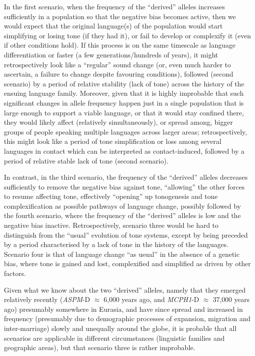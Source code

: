 \documentclass[twoside,onecolumn]{article}
\begin{document}
In the first scenario, when the frequency of the ``derived'' alleles increases sufficiently in a population so that the negative bias becomes active, then we would expect that the original language(s) of the population would start simplifying or losing tone (if they had it), or fail to develop or complexify it (even if other conditions hold).
If this process is on the same timescale as language differentiation or faster (a few generations/hundreds of years), it might retrospectively look like a ``regular'' sound change (or, even much harder to ascertain, a failure to change despite favouring conditions), followed (second scenario) by a period of relative stability (lack of tone) across the history of the ensuing language family.
Moreover, given that it is highly improbable that such significant changes in allele frequency happen just in a single population that is large enough to support a viable language, or that it would stay confined there, they would likely affect (relatively simultaneously), or spread among, bigger groups of people speaking multiple languages across larger areas; retrospectively, this might look like a period of tone simplification or loss among several languages in contact which can be interpreted as contact-induced, followed by a period of relative stable lack of tone (second scenario).

In contrast, in the third scenario, the frequency of the ``derived'' alleles decreases sufficiently to remove the negative bias against tone, ``allowing'' the other forces to resume affecting tone, effectively ``opening'' up tonogenesis and tone complexification as possible pathways of language change, possibly followed by the fourth scenario, where the frequency of the ``derived'' alleles is low and the negative bias inactive.
Retrospectively, scenario three would be hard to distinguish from the ``usual'' evolution of tone systems, except by being preceded by a period characterised by a lack of tone in the history of the languages.
Scenario four is that of language change ``as usual'' in the absence of a genetic bias, where tone is gained and lost, complexified and simplified as driven by other factors.

Given what we know about the two ``derived'' alleles, namely that they emerged relatively recently (\textit{ASPM}-D $\approx$ 6,000 years ago, and \textit{MCPH1}-D $\approx$ 37,000 years ago) presumably somewhere in Eurasia, and have since spread and increased in frequency (presumably due to demographic processes of expansion, migration and inter-marriage) slowly and unequally around the globe, it is probable that all scenarios are applicable in different circumstances (linguistic families and geographic areas), but that scenario three is rather improbable.
\end{document}
